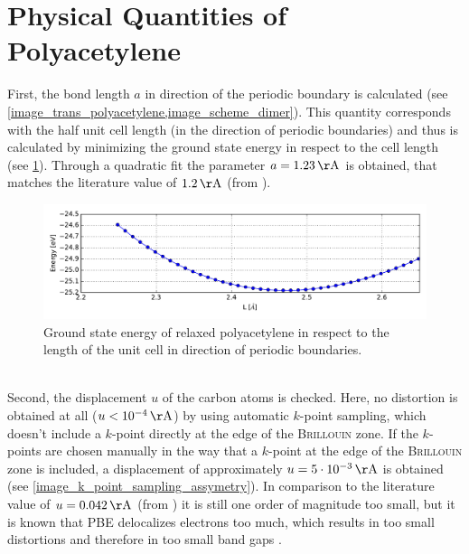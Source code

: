 \section{Physical Quantities of Polyacetylene}
First, the bond length $a$ in direction of the periodic boundary is calculated (see \cref{image_trans_polyacetylene,image_scheme_dimer}). This quantity corresponds with the half unit cell length (in the direction of periodic boundaries) and thus is calculated by minimizing the ground state energy in respect to the cell length (see \cref{image_poly_cell_len}). Through a quadratic fit the parameter $a = \unit[1.23]{\AA}$ is obtained, that matches the literature value of $\unit[1.2]{\AA}$ (from \cite{PhysRevLett.42.1698}).\\
\begin{figure}[!h]
	\centering
	\includegraphics[width = 13cm]{Images/polyacetylene/convergence/unit_cell_length}
	\caption{Ground state energy of relaxed polyacetylene in respect to the length of the unit cell in direction of periodic boundaries.}
	\label{image_poly_cell_len}
\end{figure}
\\
Second, the displacement $u$ of the carbon atoms is checked. Here, no distortion is obtained  at all ($u < \unit[10^{-4}]{\AA}$) by using automatic $k$-point sampling, which doesn't include a $k$-point directly at the edge of the \textsc{Brillouin} zone. If the $k$-points are chosen manually in the way that a $k$-point at the edge of the \textsc{Brillouin} zone is included, a displacement of approximately $u = \unit[5\cdot10^{-3}]{\AA}$ is obtained (see \cref{image_k_point_sampling_assymetry}). In comparison to the literature value of $u = \unit[0.042]{\AA}$ (from \cite{PhysRevLett.42.1698, doi:10.1021/cr990357p}) it is still one order of magnitude too small, but it is known that PBE delocalizes electrons too much, which results in too small distortions and therefore in too small band gaps  \cite{JIANG2009120,PhysRevB.84}.\\
